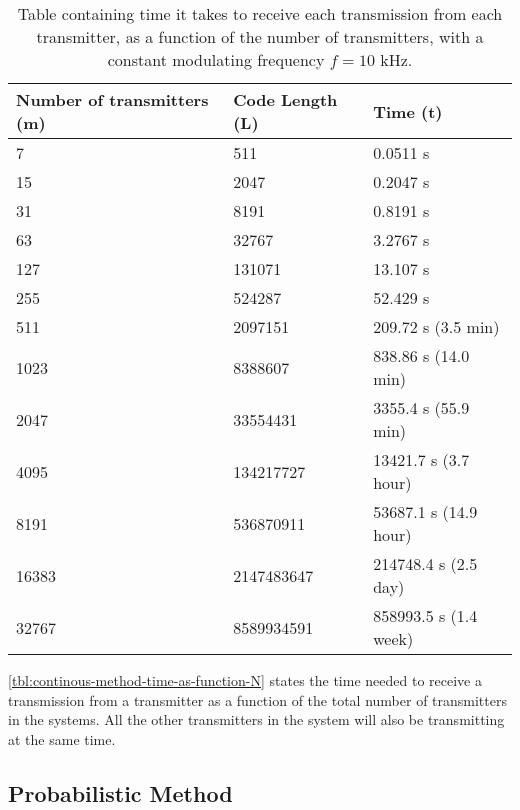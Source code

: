 \begin{table}[t]
	\centering
	\begin{tabular}{  | l | l | l | }

	\hline
	Number of transmitters (m)	& Code Length (L)		& Time (t)					\\ \hline


	7							& 511					& 0.0511 s					\\ \hline 
	15							& 2047					& 0.2047 s					\\ \hline
	31							& 8191					& 0.8191 s					\\ \hline
	63							& 32767					& 3.2767 s					\\ \hline
	127							& 131071				& 13.107 s					\\ \hline
	255							& 524287				& 52.429 s					\\ \hline
	511							& 2097151				& 209.72 s (3.5 min)		\\ \hline
	1023						& 8388607				& 838.86 s (14.0 min)		\\ \hline
	2047						& 33554431				& 3355.4 s (55.9 min)		\\ \hline
	4095						& 134217727				& 13421.7 s (3.7 hour)		\\ \hline
	8191						& 536870911				& 53687.1 s (14.9 hour)		\\ \hline
	16383						& 2147483647			& 214748.4 s (2.5 day)		\\ \hline
	32767						& 8589934591			& 858993.5 s (1.4 week)		\\ \hline



\end{tabular}
	\caption{Table containing time it takes to receive each transmission from each transmitter, as a function of the number of transmitters, with a constant modulating frequency $f = 10$ kHz.}
	\label{tbl:continous-method-time-as-function-N}
\end{table}

\autoref{tbl:continous-method-time-as-function-N} states the time needed to receive a transmission from a transmitter as a function of the total number of transmitters in the systems. 
All the other transmitters in the system will also be transmitting at the same time.





\subsection{Probabilistic Method}
\label{subsec:probabilistic-method-modulation}



